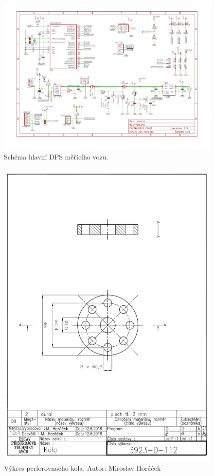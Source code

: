 \begin{figure}[h]
\includegraphics[angle=90,width=1.1\textwidth]{data/wsm_main_board_v1_3.pdf}
\caption{Schéma hlavní DPS měřicího vozu.}
\label{fig:wsm-sch}
\end{figure}

\begin{figure}[h]
\includegraphics[width=\textwidth]{data/wheel.pdf}
\caption{Výkres perforovnaého kola. Autor: Miroslav Horáček}
\label{fig:final-wheel}
\end{figure}
